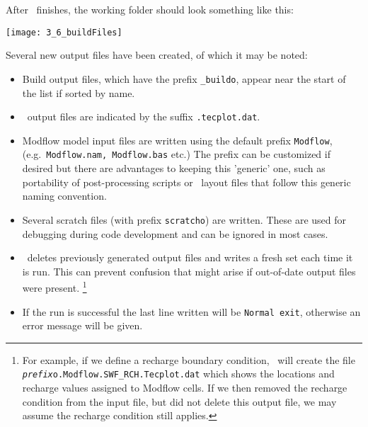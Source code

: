 After \mut\ finishes, the working folder should look something like this:

        \texttt{[image: 3\_6\_buildFiles]}

Several new output files have been created, of which it may be noted:
\begin{itemize}
    \item Build output files, which have the prefix \texttt{\_buildo}, appear near the start of the list if sorted by name.
    \item \tecplot\ output files are indicated by the suffix \texttt{.tecplot.dat}.
    \item Modflow model input files are written using the default prefix \texttt{Modflow}, (e.g.\ \texttt{Modflow.nam, Modflow.bas} etc.)  The prefix can be customized if desired but there are advantages to keeping this 'generic' one, such as portability of post-processing scripts or \tecplot\ layout files that follow this generic naming convention.
    \item Several scratch files (with prefix \texttt{scratcho}) are written. These are used for debugging during code development and can be ignored in most cases.
    \item \mut\ deletes previously generated output files and writes a fresh set each time it is run.  This can prevent confusion that might arise if out-of-date output files were present.
        \footnote{For example, if we define a recharge boundary condition, \mut\ will create the file \texttt{\textit{prefix}o.Modflow.SWF\_RCH.Tecplot.dat} which shows the locations and recharge values assigned to Modflow cells.  If we then removed the recharge condition from the input file, but did not delete this output file, we may assume the recharge condition still applies.}
    \item If the run is successful the last line written will be \texttt{Normal exit}, otherwise an error message will be given.
\end{itemize}

